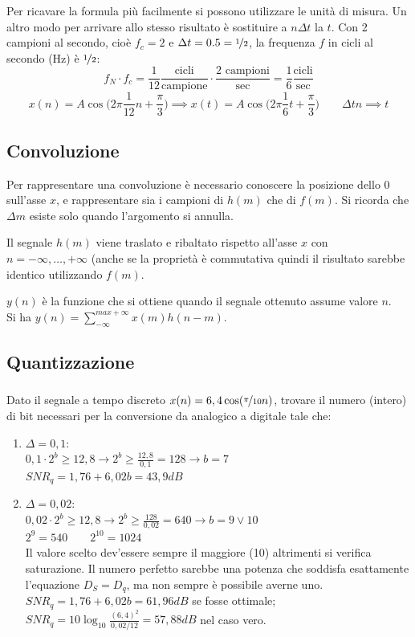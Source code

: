 Per ricavare la formula più facilmente si possono utilizzare le unità di misura. Un altro modo per arrivare allo stesso risultato è sostituire a $n\Delta t$ la $t$.
\newpage
Con 2 campioni al secondo, cioè $f_c = 2$ e $\Delta t = 0.5 = \nicefrac{1}{2}$, la frequenza $f$ in cicli al secondo (Hz) è $\nicefrac{1}{2}$:
$$f_N \cdot f_c = \frac{1}{12} \frac{\text{cicli}}{\text{campione}} \cdot \frac{2 \text{ campioni}}{\text{sec}} = \frac{1}{6} \frac{\text{cicli}}{\text{sec}}$$
$$x(n) = A\cos \Big(2\pi \frac{1}{12}n + \frac{\pi}{3}\Big) \implies x(t) = A\cos\Big(2\pi \frac{1}{6}t + \frac{\pi}{3}\Big) \qquad \Delta tn \implies t$$

\subsection{Convoluzione}
Per rappresentare una convoluzione è necessario conoscere la posizione dello 0 sull'asse $x$, e rappresentare sia i campioni di $h(m)$ che di $f(m)$. Si ricorda che $\Delta m$ esiste solo quando l'argomento si annulla.

Il segnale $h(m)$ viene traslato e ribaltato rispetto all'asse $x$ con $n = -\infty, \dots, +\infty$ (anche se la proprietà è commutativa quindi il risultato sarebbe identico utilizzando $f(m)$. 

$y(n)$ è la funzione che si ottiene quando il segnale ottenuto assume valore $n$. \\
Si ha $y(n) = \sum_{-\infty}^{max+\infty} x(m)h(n - m)$.


\subsection{Quantizzazione}
\subsubsection{}
Dato il segnale a tempo discreto $x(n) = 6,4 \cos (\nicefrac{\pi}{10}n)$, trovare il numero (intero) di bit necessari per la conversione da analogico a digitale tale che:
\begin{enumerate}
	\item $\Delta = 0,1$: \\
	$0,1 \cdot 2^b \geq 12,8 \rightarrow 2^b \geq \frac{12,8}{0,1} = 128 \rightarrow b = 7$ \\
	$SNR_q = 1,76 + 6,02b = 43,9 dB$
	\item $\Delta = 0,02$: \\
	$0,02 \cdot 2^b \geq 12,8 \rightarrow 2^b \geq \frac{128}{0,02} = 640 \rightarrow b = 9 \lor 10$ \\
	$2^9 = 540 \qquad 2^10= 1024$ \\
	Il valore scelto dev'essere sempre il maggiore (10) altrimenti si verifica saturazione. Il numero perfetto sarebbe una potenza che soddisfa esattamente l'equazione $D_S = D_q$, ma non sempre è possibile averne uno. \\
	$SNR_q = 1,76 + 6,02b = 61,96 dB$ se fosse ottimale;
	$SNR_q = 10\log_{10} \frac{(6,4)^2}{0,02 / 12} = 57,88 dB$ nel caso vero.
	\end{enumerate}

